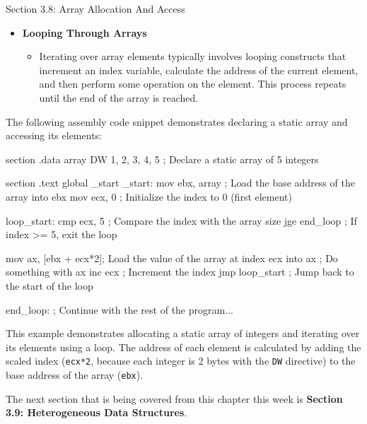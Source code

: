 \begin{notes}{Section 3.8: Array Allocation And Access}
\begin{itemize}
\begin{itemize}
            index by the size of the array elements to compute the offset from the base address.
        \end{itemize}
        \item \textbf{Looping Through Arrays}
        \begin{itemize}
            \item Iterating over array elements typically involves looping constructs that increment an index variable, calculate the address of the current element, and then perform some operation on 
            the element. This process repeats until the end of the array is reached.
        \end{itemize}
    \end{itemize}
    
    \begin{highlight}
        The following assembly code snippet demonstrates declaring a static array and accessing its elements:
    
    \begin{code}[Assembly]
    section .data
    array DW 1, 2, 3, 4, 5  ; Declare a static array of 5 integers

    section .text
    global _start
    _start:
        mov ebx, array       ; Load the base address of the array into ebx
        mov ecx, 0           ; Initialize the index to 0 (first element)

    loop_start:
        cmp ecx, 5           ; Compare the index with the array size
        jge end_loop         ; If index >= 5, exit the loop

        mov ax, [ebx + ecx*2]; Load the value of the array at index ecx into ax
        ; Do something with ax
        inc ecx              ; Increment the index
        jmp loop_start       ; Jump back to the start of the loop

    end_loop:
        ; Continue with the rest of the program...
    \end{code}
    
        This example demonstrates allocating a static array of integers and iterating over its elements using a loop. The address of each element is calculated by adding the scaled index (\texttt{ecx*2}, 
        because each integer is 2 bytes with the \texttt{DW} directive) to the base address of the array (\texttt{ebx}).
    \end{highlight}    
\end{notes}

The next section that is being covered from this chapter this week is \textbf{Section 3.9: Heterogeneous Data Structures}.

